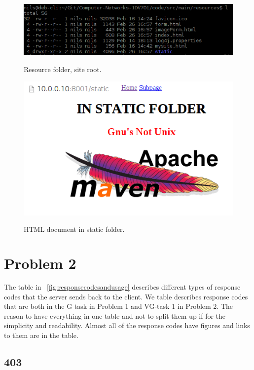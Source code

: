 \documentclass[a4paper,12pt]{article} %
\begin{document}
{\begin{figure}[H]
    \centering  
    \includegraphics[scale=0.5]{img/screenshots/filesresourcefolder.png}
	\label{fig:filesresourcefolder}
	\caption{Resource folder, site root.}
\end{figure}


\begin{figure}[H]
    \centering  
    \includegraphics[scale=0.6]{img/screenshots/htmlstatic.png}
	\label{fig:htmlstatic}
	\caption{HTML document in static folder.}
\end{figure}


\section{Problem 2}

The table in ~\ref{fig:responsecodesandusage} describes different types of response codes that the server sends back to the client.
We table describes response codes that are both in the G task in Problem 1 and VG-task 1 in Problem 2.
The reason to have everything in one table and not to split them up if for the simplicity and readability.
Almost all of the response codes have figures and links to them are in the table.

\subsection{403}

}
\end{document}
